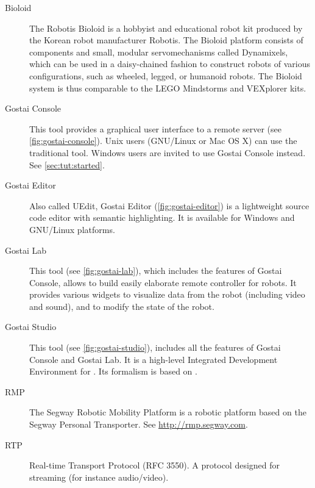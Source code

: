 \begin{description}
\item[Bioloid] The Robotis Bioloid is a hobbyist and educational robot kit
  produced by the Korean robot manufacturer Robotis. The Bioloid platform
  consists of components and small, modular servomechanisms called
  Dynamixels, which can be used in a daisy-chained fashion to construct
  robots of various configurations, such as wheeled, legged, or humanoid
  robots. The Bioloid system is thus comparable to the LEGO Mindstorms and
  VEXplorer kits.

\item[Gostai Console] This tool provides a graphical user interface to a
  remote \urbi server (see \autoref{fig:gostai-console}).  Unix users
  (GNU/Linux or Mac OS X) can use the traditional  tool.
  Windows users are invited to use Gostai Console instead.  See
  \autoref{sec:tut:started}.


\item[Gostai Editor] Also called UEdit, Gostai \us Editor
  (\autoref{fig:gostai-editor}) is a lightweight \us source code editor with
  semantic highlighting. It is available for Windows and GNU/Linux
  platforms.


\item[Gostai Lab] This tool (see \autoref{fig:gostai-lab}), which
  includes the features of Gostai Console, allows to build easily
  elaborate remote controller for robots.  It provides various widgets
  to visualize data from the robot (including video and sound), and to
  modify the state of the robot.


\item[Gostai Studio] This tool (see \autoref{fig:gostai-studio}),
  includes all the features of Gostai Console and Gostai Lab.  It is a
  high-level Integrated Development Environment for \urbi.  Its
  formalism is based on .


\item[RMP] The Segway Robotic Mobility Platform is a robotic platform based
  on the Segway Personal Transporter.  See \url{http://rmp.segway.com}.

\item[RTP] Real-time Transport Protocol (RFC 3550).  A protocol designed for
  streaming (for instance audio/video).


\end{description}
